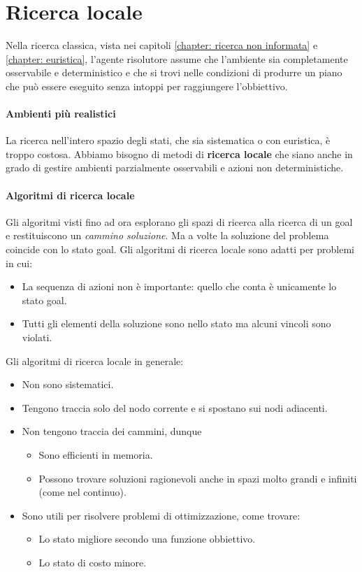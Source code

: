 \chapter{Ricerca locale}
Nella ricerca classica, vista nei capitoli \ref{chapter: ricerca non informata}
e \ref{chapter: euristica}, l'agente risolutore assume che l'ambiente sia
completamente osservabile e deterministico e che si trovi nelle condizioni di
produrre un piano che pu\`o essere eseguito senza intoppi per raggiungere
l'obbiettivo.

\subsubsection{Ambienti pi\`u realistici}
La ricerca nell'intero spazio degli stati, che sia sistematica o con euristica,
\`e troppo costosa. Abbiamo bisogno di metodi di \textbf{ricerca locale} che siano
anche in grado di gestire ambienti parzialmente osservabili e azioni non
deterministiche.

\subsubsection{Algoritmi di ricerca locale}
Gli algoritmi visti fino ad ora esplorano gli spazi di ricerca alla ricerca di un
goal e restituiscono un \emph{cammino soluzione}. Ma a volte la soluzione del problema
coincide con lo stato goal. Gli algoritmi di ricerca locale sono adatti per problemi in
cui:
\begin{itemize}
	\item La sequenza di azioni non \`e importante: quello che conta \`e unicamente
	      lo stato goal.
	\item Tutti gli elementi della soluzione sono nello stato ma alcuni vincoli sono
	      violati.
\end{itemize}
Gli algoritmi di ricerca locale in generale:
\begin{itemize}
	\item Non sono sistematici.
	\item Tengono traccia solo del nodo corrente e si spostano sui nodi adiacenti.
	\item Non tengono traccia dei cammini, dunque
	      \begin{itemize}
		      \item Sono efficienti in memoria.
		      \item Possono trovare soluzioni ragionevoli anche in spazi molto grandi e
		            infiniti (come nel continuo).
	      \end{itemize}
	\item Sono utili per risolvere problemi di ottimizzazione, come trovare:
	      \begin{itemize}
		      \item Lo stato migliore secondo una funzione obbiettivo.
		      \item Lo stato di costo minore.
	      \end{itemize}
\end{itemize}
